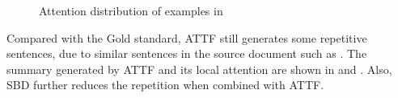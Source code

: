 \begin{figure}[th!]
\centering
{}
\quad
{}
\quad
{}
\quad
{}
\caption{Attention distribution of examples in }
\label{fig:attn_maps}
\end{figure}

Compared with the Gold standard,
ATTF still generates some repetitive sentences,
due to similar sentences in the source document
such as .
The summary generated by ATTF and its local attention are
shown in  and .
Also, SBD further reduces the repetition when combined with ATTF. 

